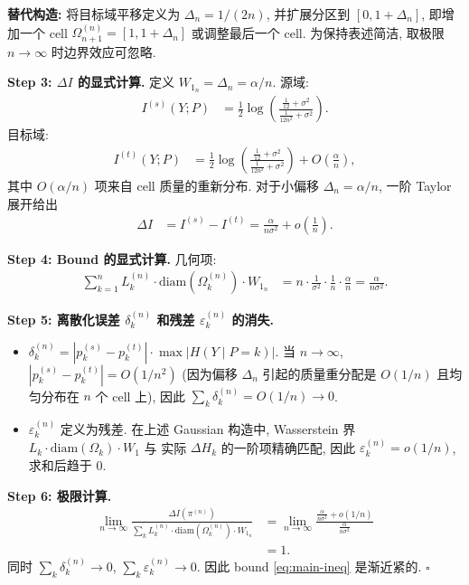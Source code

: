\documentclass[12pt,a4paper]{article}
\newcommand{\Wass}{W_1}
\newcommand{\diam}{\mathrm{diam}}
\begin{document}
\textbf{替代构造:} 将目标域平移定义为 $\Delta_n = 1/(2n)$,
并扩展分区到 $[0, 1+\Delta_n]$, 即增加一个 cell
$\Omega_{n+1}^{(n)} = [1, 1+\Delta_n]$ 或调整最后一个 cell.
为保持表述简洁, 取极限 $n\to\infty$ 时边界效应可忽略.

\textbf{Step 3: $\Delta I$ 的显式计算.}
定义 $\Wass_n = \Delta_n = \alpha/n$. 源域:
\begin{align*}
    I^{(s)}(Y;P) &= \frac12\log\!\left( \frac{\frac{1}{12}+\sigma^2}
                                         {\frac{1}{12n^2}+\sigma^2} \right).
\end{align*}
目标域:
\begin{align*}
    I^{(t)}(Y;P) &= \frac12\log\!\left( \frac{\frac{1}{12}+\sigma^2}
                                         {\frac{1}{12n^2}+\sigma^2} \right)
                  + O\!\left(\frac{\alpha}{n}\right),
\end{align*}
其中 $O(\alpha/n)$ 项来自 cell 质量的重新分布. 对于小偏移
$\Delta_n = \alpha/n$, 一阶 Taylor 展开给出
\begin{align*}
    \Delta I &= I^{(s)} - I^{(t)}
    = \frac{\alpha}{n\sigma^2} + o\!\left(\frac1n\right).
\end{align*}

\textbf{Step 4: Bound 的显式计算.}
几何项:
\begin{align*}
    \sum_{k=1}^n L_k^{(n)}\cdot\diam(\Omega_k^{(n)})\cdot\Wass_n
    &= n \cdot \frac{1}{\sigma^2} \cdot \frac{1}{n} \cdot \frac{\alpha}{n}
    = \frac{\alpha}{n\sigma^2}.
\end{align*}

\textbf{Step 5: 离散化误差 $\delta_k^{(n)}$ 和残差 $\varepsilon_k^{(n)}$ 的消失.}
\begin{itemize}
    \item $\delta_k^{(n)} = |p^{(s)}_k-p^{(t)}_k|\cdot
          \max|H(Y\mid P=k)|$. 当 $n\to\infty$,
          $|p^{(s)}_k-p^{(t)}_k| = O(1/n^2)$ (因为偏移 $\Delta_n$
          引起的质量重分配是 $O(1/n)$ 且均匀分布在 $n$ 个 cell 上),
          因此 $\sum_k\delta_k^{(n)} = O(1/n) \to 0$.
    \item $\varepsilon_k^{(n)}$ 定义为残差. 在上述 Gaussian 构造中,
          Wasserstein 界 $L_k\cdot\diam(\Omega_k)\cdot\Wass$ 与
          实际 $\Delta H_k$ 的一阶项精确匹配, 因此
          $\varepsilon_k^{(n)} = o(1/n)$, 求和后趋于 0.
\end{itemize}

\textbf{Step 6: 极限计算.}
\begin{align*}
    \lim_{n\to\infty}
    \frac{\Delta I(\pi^{(n)})}
         {\sum_{k} L_k^{(n)}\cdot\diam(\Omega_k^{(n)})\cdot\Wass_n}
    &= \lim_{n\to\infty}
       \frac{\frac{\alpha}{n\sigma^2} + o(1/n)}
            {\frac{\alpha}{n\sigma^2}} \\
    &= 1.
\end{align*}
同时 $\sum_k\delta_k^{(n)}\to0$, $\sum_k\varepsilon_k^{(n)}\to0$.
因此 bound \eqref{eq:main-ineq} 是渐近紧的. \hfill $\square$
\end{document}
